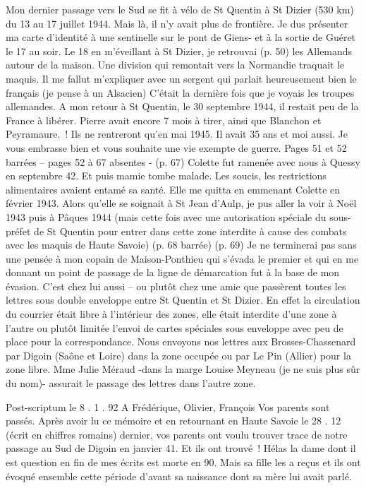\documentclass[a5paper,pagesize,10pt,bibtotoc,pointlessnumbers,
normalheadings,DIV=9,twoside=false]{scrbook}
\begin{document}
	Mon dernier passage vers le Sud se fit à vélo de St Quentin à St Dizier (530 km) du 13 au 17 juillet 1944. Mais là, il n’y avait plus de frontière. Je dus présenter ma carte d’identité à une sentinelle sur le pont de Giens- et à la sortie de Guéret le 17 au soir. Le 18 en m’éveillant à St Dizier, je retrouvai (p. 50) les Allemands autour de la maison. Une division qui remontait vers la Normandie traquait le maquis. Il me fallut m’expliquer avec un sergent qui parlait heureusement bien le français (je pense à un Alsacien) C’était la dernière fois que je voyais les troupes allemandes. 
	A mon retour à St Quentin, le 30 septembre 1944, il restait peu de la France à libérer.
	Pierre avait encore 7 mois à tirer, ainsi que Blanchon et Peyramaure. ! Ils ne rentreront qu’en mai 1945. Il avait 35 ans et moi aussi. Je vous embrasse bien et vous souhaite une vie exempte de guerre.
	Pages 51 et 52  barrées – pages 52 à 67 absentes -
	(p. 67) Colette fut ramenée avec nous à Quessy en septembre 42. Et puis mamie tombe malade. Les soucis, les restrictions alimentaires avaient entamé sa santé. Elle me quitta en emmenant Colette en février 1943. 
	Alors qu’elle se soignait à St Jean d’Aulp, je pus aller la voir à Noël 1943 puis à Pâques 1944 (mais cette fois avec une autorisation spéciale du sous-préfet de St Quentin pour entrer dans cette zone interdite à cause des combats avec les maquis de Haute Savoie) (p. 68 barrée)
	(p. 69) Je ne terminerai pas sans une pensée à mon copain de Maison-Ponthieu qui s’évada le premier et qui en me donnant un point de passage de la ligne de démarcation fut à la base de mon évasion. C’est chez lui aussi – ou plutôt chez une amie que passèrent toutes les lettres sous double enveloppe  entre St Quentin et St Dizier. En effet la circulation du courrier était libre à l’intérieur des zones, elle était interdite d’une zone à l’autre ou plutôt limitée l’envoi de cartes spéciales sous enveloppe avec peu de place pour la correspondance. Nous envoyons nos lettres aux Brosses-Chassenard par Digoin (Saône et Loire) dans la zone occupée ou par Le Pin (Allier) pour la zone libre. Mme Julie Méraud  -dans la marge Louise Meyneau (je ne suis plus sûr du nom)- assurait le passage des lettres dans l’autre zone.
	
	
	Post-scriptum   le 8 . 1 . 92
	A Frédérique, Olivier, François
	Vos parents sont passés.
	Après avoir lu ce mémoire et en retournant en Haute Savoie le 28 . 12 (écrit en chiffres romains) dernier, vos parents ont voulu trouver trace de notre passage au Sud de Digoin en janvier 41. Et ils ont trouvé !  Hélas la dame dont il est question en fin de mes écrits est morte en 90. Mais sa fille les a reçus et ils ont évoqué ensemble cette période d’avant sa naissance dont sa mère lui avait parlé. 
	

	
	
\end{document}
